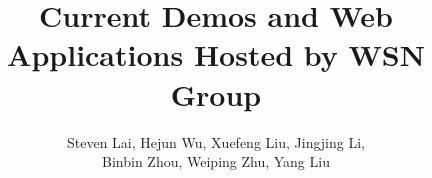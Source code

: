 \title{Current Demos and Web Applications Hosted by WSN Group}
\author{Steven Lai, Hejun Wu, Xuefeng Liu, Jingjing Li,\\
Binbin Zhou, Weiping Zhu, Yang Liu}
\maketitle